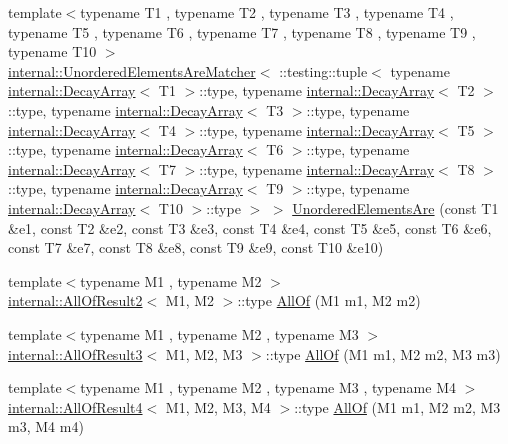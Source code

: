 \begin{DoxyCompactItemize}
{\footnotesize template$<$typename T1 , typename T2 , typename T3 , typename T4 , typename T5 , typename T6 , typename T7 , typename T8 , typename T9 , typename T10 $>$ }\\\hyperlink{classtesting_1_1internal_1_1_unordered_elements_are_matcher}{internal\+::\+Unordered\+Elements\+Are\+Matcher}$<$ \+::testing\+::tuple$<$ typename \hyperlink{structtesting_1_1internal_1_1_decay_array}{internal\+::\+Decay\+Array}$<$ T1 $>$\+::type, typename \hyperlink{structtesting_1_1internal_1_1_decay_array}{internal\+::\+Decay\+Array}$<$ T2 $>$\+::type, typename \hyperlink{structtesting_1_1internal_1_1_decay_array}{internal\+::\+Decay\+Array}$<$ T3 $>$\+::type, typename \hyperlink{structtesting_1_1internal_1_1_decay_array}{internal\+::\+Decay\+Array}$<$ T4 $>$\+::type, typename \hyperlink{structtesting_1_1internal_1_1_decay_array}{internal\+::\+Decay\+Array}$<$ T5 $>$\+::type, typename \hyperlink{structtesting_1_1internal_1_1_decay_array}{internal\+::\+Decay\+Array}$<$ T6 $>$\+::type, typename \hyperlink{structtesting_1_1internal_1_1_decay_array}{internal\+::\+Decay\+Array}$<$ T7 $>$\+::type, typename \hyperlink{structtesting_1_1internal_1_1_decay_array}{internal\+::\+Decay\+Array}$<$ T8 $>$\+::type, typename \hyperlink{structtesting_1_1internal_1_1_decay_array}{internal\+::\+Decay\+Array}$<$ T9 $>$\+::type, typename \hyperlink{structtesting_1_1internal_1_1_decay_array}{internal\+::\+Decay\+Array}$<$ T10 $>$\+::type $>$ $>$ \hyperlink{namespacetesting_ae0e6c9754b17623a64358da8d38c4d13}{Unordered\+Elements\+Are} (const T1 \&e1, const T2 \&e2, const T3 \&e3, const T4 \&e4, const T5 \&e5, const T6 \&e6, const T7 \&e7, const T8 \&e8, const T9 \&e9, const T10 \&e10)
\item 
{\footnotesize template$<$typename M1 , typename M2 $>$ }\\\hyperlink{structtesting_1_1internal_1_1_all_of_result2}{internal\+::\+All\+Of\+Result2}$<$ M1, M2 $>$\+::type \hyperlink{namespacetesting_af7618e8606c1cb45738163688944e2b7}{All\+Of} (M1 m1, M2 m2)
\item 
{\footnotesize template$<$typename M1 , typename M2 , typename M3 $>$ }\\\hyperlink{structtesting_1_1internal_1_1_all_of_result3}{internal\+::\+All\+Of\+Result3}$<$ M1, M2, M3 $>$\+::type \hyperlink{namespacetesting_a75934d8ea6b986d2157a5ebfe68f9904}{All\+Of} (M1 m1, M2 m2, M3 m3)
\item 
{\footnotesize template$<$typename M1 , typename M2 , typename M3 , typename M4 $>$ }\\\hyperlink{structtesting_1_1internal_1_1_all_of_result4}{internal\+::\+All\+Of\+Result4}$<$ M1, M2, M3, M4 $>$\+::type \hyperlink{namespacetesting_a4a9a119cde16e43b364f3573136857a1}{All\+Of} (M1 m1, M2 m2, M3 m3, M4 m4)

\end{DoxyCompactItemize}
